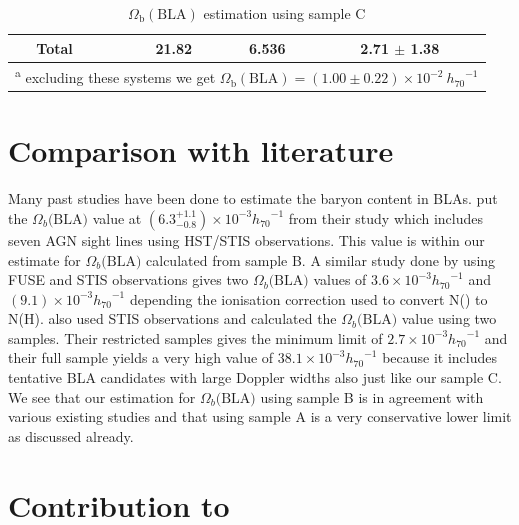 \begin{table}[!h]
\begin{tabular}{ccccc}
            \hline 
 
            Total &  &  21.82 &  6.536  & 2.71 $\pm$  1.38 \\ 

            \hline \hline 
            \multicolumn{5}{l}{\textsuperscript{a} \footnotesize{excluding these systems we get $\Omega_\text{b}(\text{BLA}) = (1.00 \pm  0.22) \times 10^{-2} \ {h_{70}}^{-1}$}} \\
        \end{tabular}
    \caption{$\Omega_\text{b}(\text{BLA})$ estimation using sample C}
    \label{tab:Omega_b_sampleC}
\end{table}


\section{Comparison with literature}

Many past studies have been done to estimate the baryon content in BLAs. \citet{Danforth_2010} put the $\Omega_b\text{(BLA)}$ value at $(6.3^{+1.1}_{-0.8})\times 10^{-3} {h_{70}}^{-1}$ from their study which includes seven AGN sight lines using HST/STIS observations. This value is within our estimate for $\Omega_b\text{(BLA)}$ calculated from sample B. A similar study done by \citet{Lehner-2007} using FUSE and STIS observations gives two $\Omega_b\text{(BLA)}$ values of $3.6\times 10^{-3} {h_{70}}^{-1}$ and $(9.1)\times 10^{-3} {h_{70}}^{-1}$ depending the ionisation correction used to convert N() to N(H). \citet{Richter-2006} also used STIS observations and calculated the $\Omega_b\text{(BLA)}$ value using two samples. Their restricted samples gives the minimum limit of $2.7\times 10^{-3} {h_{70}}^{-1}$ and their full sample yields a very high value of $38.1\times 10^{-3} {h_{70}}^{-1}$ because it includes tentative BLA candidates with large Doppler widths also just like our sample C. We see that our estimation for $\Omega_b\text{(BLA)}$ using sample B is in agreement with various existing studies and that using sample A is a very conservative lower limit as discussed already.


\section{\texorpdfstring{Contribution to }{Contribution to Omega_b}}

